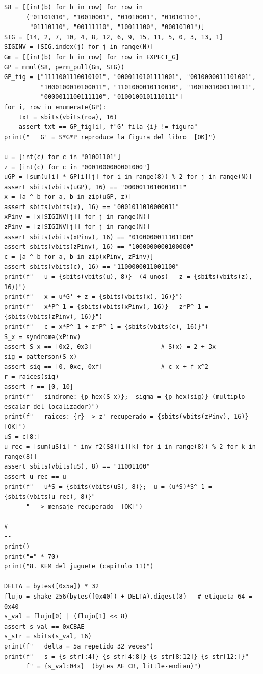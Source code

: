 \begin{lstlisting}
S8 = [[int(b) for b in row] for row in
      ("01101010", "10010001", "01010001", "01010110",
       "01110110", "00111110", "10011100", "00010101")]
SIG = [14, 2, 7, 10, 4, 8, 12, 6, 9, 15, 11, 5, 0, 3, 13, 1]
SIGINV = [SIG.index(j) for j in range(N)]
Gm = [[int(b) for b in row] for row in EXPECT_G]
GP = mmul(S8, perm_pull(Gm, SIG))
GP_fig = ["1111001110010101", "0000110101111001", "0010000011101001",
          "1000100010100011", "1101000010110010", "1001001000110111",
          "0000011100111110", "0100100101110111"]
for i, row in enumerate(GP):
    txt = sbits(vbits(row), 16)
    assert txt == GP_fig[i], f"G' fila {i} != figura"
print("   G' = S*G*P reproduce la figura del libro  [OK]")

u = [int(c) for c in "01001101"]
z = [int(c) for c in "0001000000001000"]
uGP = [sum(u[i] * GP[i][j] for i in range(8)) % 2 for j in range(N)]
assert sbits(vbits(uGP), 16) == "0000011010001011"
x = [a ^ b for a, b in zip(uGP, z)]
assert sbits(vbits(x), 16) == "0001011010000011"
xPinv = [x[SIGINV[j]] for j in range(N)]
zPinv = [z[SIGINV[j]] for j in range(N)]
assert sbits(vbits(xPinv), 16) == "0100000011101100"
assert sbits(vbits(zPinv), 16) == "1000000000100000"
c = [a ^ b for a, b in zip(xPinv, zPinv)]
assert sbits(vbits(c), 16) == "1100000011001100"
print(f"   u = {sbits(vbits(u), 8)}  (4 unos)   z = {sbits(vbits(z), 16)}")
print(f"   x = u*G' + z = {sbits(vbits(x), 16)}")
print(f"   x*P^-1 = {sbits(vbits(xPinv), 16)}   z*P^-1 = {sbits(vbits(zPinv), 16)}")
print(f"   c = x*P^-1 + z*P^-1 = {sbits(vbits(c), 16)}")
S_x = syndrome(xPinv)
assert S_x == [0x2, 0x3]                   # S(x) = 2 + 3x
sig = patterson(S_x)
assert sig == [0, 0xc, 0xf]                # c x + f x^2
r = raices(sig)
assert r == [0, 10]
print(f"   sindrome: {p_hex(S_x)};  sigma = {p_hex(sig)} (multiplo escalar del localizador)")
print(f"   raices: {r} -> z' recuperado = {sbits(vbits(zPinv), 16)}  [OK]")
uS = c[8:]
u_rec = [sum(uS[i] * inv_f2(S8)[i][k] for i in range(8)) % 2 for k in range(8)]
assert sbits(vbits(uS), 8) == "11001100"
assert u_rec == u
print(f"   u*S = {sbits(vbits(uS), 8)};  u = (u*S)*S^-1 = {sbits(vbits(u_rec), 8)}"
      "  -> mensaje recuperado  [OK]")

# ----------------------------------------------------------------------
print()
print("=" * 70)
print("8. KEM del juguete (capitulo 11)")

DELTA = bytes([0x5a]) * 32
flujo = shake_256(bytes([0x40]) + DELTA).digest(8)   # etiqueta 64 = 0x40
s_val = flujo[0] | (flujo[1] << 8)
assert s_val == 0xCBAE
s_str = sbits(s_val, 16)
print(f"   delta = 5a repetido 32 veces")
print(f"   s = {s_str[:4]} {s_str[4:8]} {s_str[8:12]} {s_str[12:]}"
      f" = {s_val:04x}  (bytes AE CB, little-endian)")


\end{lstlisting}
